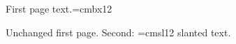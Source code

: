\documentclass{article}
\begin{document}
First page text.\font\fb=cmbx12

Unchanged first page.
\newpage
Second: {\font\fy=cmsl12 \fy slanted text}.
\end{document}
